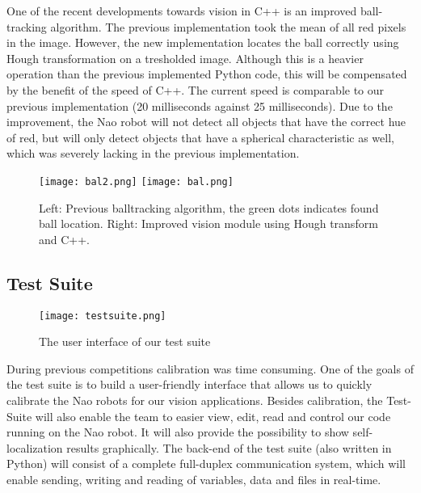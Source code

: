 \documentclass[11pt]{llncs}
\begin{document}
One of the recent developments towards vision in C++ is an improved ball-tracking algorithm. The previous implementation took the mean of all red pixels in the image. However, the new implementation locates the ball correctly using Hough transformation on a tresholded image. Although this is a heavier operation than the previous implemented Python code, this will be compensated by the benefit of the speed of C++. The current speed is comparable to our previous implementation (20 milliseconds against 25 milliseconds). Due to the improvement, the Nao robot will not detect all objects that have the correct hue of red, but will only detect objects that have a spherical characteristic as well, which was severely lacking in the previous implementation.
\begin{figure}[!ht]
  \centering
  \texttt{[image: bal2.png]}
  \texttt{[image: bal.png]}
  \caption{Left: Previous balltracking algorithm, the green dots indicates found ball location. Right: Improved vision module using Hough transform and C++.}
\label{fig:balls}
\end{figure}

\newpage

\subsection{Test Suite}

\begin{wrapfigure}{r}{0.31\textwidth}
  \begin{center}
    \vspace{-0.25cm}
    \texttt{[image: testsuite.png]}
	\caption{The user interface of our test suite}
  \end{center}
\end{wrapfigure}

During previous competitions calibration was time consuming. One of the goals of the test suite is to build a user-friendly interface that allows us to quickly calibrate the Nao robots for our vision applications. Besides calibration, the Test-Suite will also enable the team to easier view, edit, read and control our code running on the Nao robot. It will also provide the possibility to show self-localization results graphically.
The back-end of the test suite (also written in Python) will consist of a complete full-duplex communication system, which will enable sending, writing and reading of variables, data and files in real-time.
\end{document}
